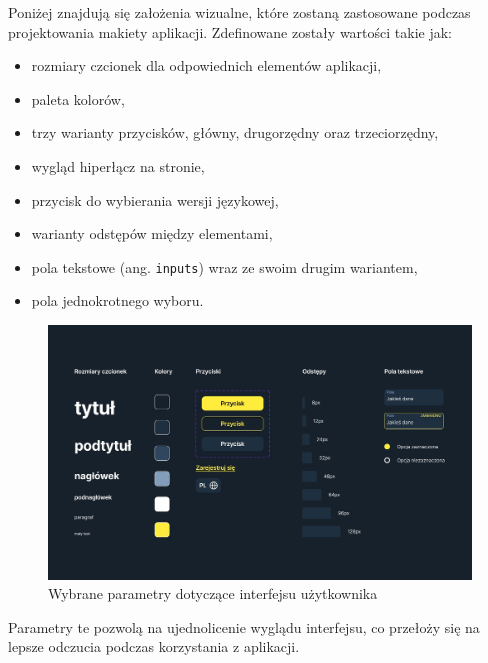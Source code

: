 Poniżej znajdują się założenia wizualne, które zostaną zastosowane podczas projektowania makiety aplikacji. Zdefinowane zostały wartości takie jak:
\begin{itemize}
    \item rozmiary czcionek dla odpowiednich elementów aplikacji,
    \item paleta kolorów,
    \item trzy warianty przycisków, główny, drugorzędny oraz trzeciorzędny,
    \item wygląd hiperłącz na stronie,
    \item przycisk do wybierania wersji językowej,
    \item warianty odstępów między elementami,
    \item pola tekstowe (ang. \texttt{inputs}) wraz ze swoim drugim wariantem,
    \item pola jednokrotnego wyboru.
\end{itemize}
\begin{figure}[H]
	\centering
		\includegraphics[width=0.7\linewidth]{rozdzial1/komponenty.png}
	\caption{Wybrane parametry dotyczące interfejsu użytkownika}
	\label{Rys. fig:Wybrane parametry dotyczące interfejsu użytkownika}
\end{figure}
Parametry te pozwolą na ujednolicenie wyglądu interfejsu, co przełoży się na lepsze odczucia podczas korzystania z aplikacji.

